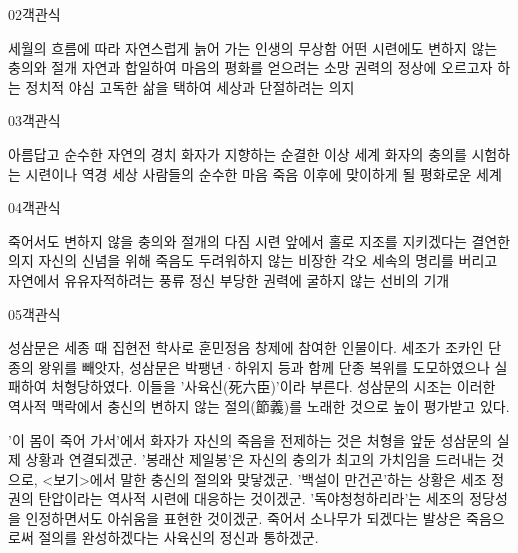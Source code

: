 \documentclass[fs85,seriesWit]{korfarm-base}
\begin{document}
\begin{kfQBlock}{02}{객관식}
\begin{kfChoices}
\kfChoice 세월의 흐름에 따라 자연스럽게 늙어 가는 인생의 무상함
\kfChoice 어떤 시련에도 변하지 않는 충의와 절개
\kfChoice 자연과 합일하여 마음의 평화를 얻으려는 소망
\kfChoice 권력의 정상에 오르고자 하는 정치적 야심
\kfChoice 고독한 삶을 택하여 세상과 단절하려는 의지
\end{kfChoices}
\end{kfQBlock}

\begin{kfQBlock}{03}{객관식}
\begin{kfChoices}
\kfChoice 아름답고 순수한 자연의 경치
\kfChoice 화자가 지향하는 순결한 이상 세계
\kfChoice 화자의 충의를 시험하는 시련이나 역경
\kfChoice 세상 사람들의 순수한 마음
\kfChoice 죽음 이후에 맞이하게 될 평화로운 세계
\end{kfChoices}
\end{kfQBlock}

\begin{kfQBlock}{04}{객관식}
\begin{kfChoices}
\kfChoice 죽어서도 변하지 않을 충의와 절개의 다짐
\kfChoice 시련 앞에서 홀로 지조를 지키겠다는 결연한 의지
\kfChoice 자신의 신념을 위해 죽음도 두려워하지 않는 비장한 각오
\kfChoice 세속의 명리를 버리고 자연에서 유유자적하려는 풍류 정신
\kfChoice 부당한 권력에 굴하지 않는 선비의 기개
\end{kfChoices}
\end{kfQBlock}

\begin{kfQBlock}{05}{객관식}
\begin{kfEvidence}성삼문은 세종 때 집현전 학사로 훈민정음 창제에 참여한 인물이다. 세조가 조카인 단종의 왕위를 빼앗자, 성삼문은 박팽년·하위지 등과 함께 단종 복위를 도모하였으나 실패하여 처형당하였다. 이들을 '사육신(死六臣)'이라 부른다. 성삼문의 시조는 이러한 역사적 맥락에서 충신의 변하지 않는 절의(節義)를 노래한 것으로 높이 평가받고 있다.\end{kfEvidence}
\begin{kfChoices}
\kfChoice '이 몸이 죽어 가서'에서 화자가 자신의 죽음을 전제하는 것은 처형을 앞둔 성삼문의 실제 상황과 연결되겠군.
\kfChoice '봉래산 제일봉'은 자신의 충의가 최고의 가치임을 드러내는 것으로, <보기>에서 말한 충신의 절의와 맞닿겠군.
\kfChoice '백설이 만건곤'하는 상황은 세조 정권의 탄압이라는 역사적 시련에 대응하는 것이겠군.
\kfChoice '독야청청하리라'는 세조의 정당성을 인정하면서도 아쉬움을 표현한 것이겠군.
\kfChoice 죽어서 소나무가 되겠다는 발상은 죽음으로써 절의를 완성하겠다는 사육신의 정신과 통하겠군.
\end{kfChoices}
\end{kfQBlock}
\end{document}

